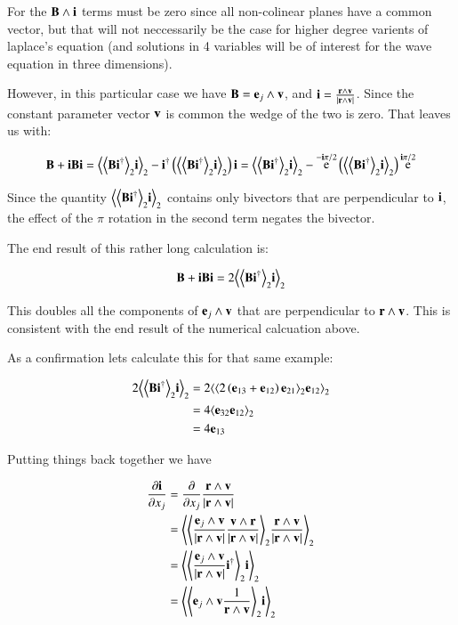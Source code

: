 \documentclass{article}      %
\newcommand{\dxj}[2] {\frac {\partial {#1}} {\partial {x_{#2}}}}
\DeclareMathOperator{\Exp}{e}
\newcommand{\gpgrade}[2] {{\left\langle{{#1}}\right\rangle}_{#2}}
\newcommand{\gpgradetwo}[1] {\gpgrade{#1}{2}}
\begin{document}
For  the $\mathbf{B} \wedge \mathbf{i}$ terms must be zero since all non-colinear planes have a common vector, but that will not neccessarily be the case for
higher degree varients of laplace's equation (and solutions in 4 variables will be of interest for the wave equation in three dimensions).

However, in this particular case we have $\mathbf{B} = \mathbf{e}_j \wedge \mathbf{v}$, and $\mathbf{i} = \frac{\mathbf{r} \wedge \mathbf{v}}{\lvert{\mathbf{r}\wedge \mathbf{v}}\rvert}$.  Since the constant parameter vector $\mathbf{v}$
is common the wedge of the two is zero.  That leaves us with:

\[
\BB + \Bi\BB\Bi
=
\gpgradetwo{\gpgradetwo{\BB \Bi^\dagger} \Bi} - \Bi^\dagger\left( \gpgradetwo{\gpgradetwo{\BB \Bi^\dagger} \Bi} \right)\Bi 
=
\gpgradetwo{\gpgradetwo{\BB \Bi^\dagger} \Bi} - \Exp^{-\Bi\pi/2}\left( \gpgradetwo{\gpgradetwo{\BB \Bi^\dagger} \Bi} \right)\Exp^{\Bi\pi/2}
\]

Since the quantity $\gpgradetwo{\gpgradetwo{\BB \Bi^\dagger} \Bi}$ contains only bivectors that are perpendicular to $\mathbf{i}$, the effect of the $\pi$ rotation in the 
second term negates the bivector.

The end result of this rather long calculation is:

\[
\BB + \Bi\BB\Bi = 2 \gpgradetwo{\gpgradetwo{\BB \Bi^\dagger} \Bi}
\]

This doubles all the components of $\mathbf{e}_j \wedge \mathbf{v}$ that are perpendicular to $\mathbf{r} \wedge \mathbf{v}$.  This is consistent with the end result of the numerical
calcuation above.

As a confirmation lets calculate this for that same example:

\begin{align*}
2\gpgradetwo{\gpgradetwo{\BB \Bi^\dagger} \Bi}
&= 2\gpgradetwo{\gpgradetwo{ 2\left(\Be_{13} + \Be_{12}\right) \Be_{21} } \Be_{12}} \\
&= 4\gpgradetwo{\Be_{32} \Be_{12}} \\
&= 4\Be_{13} \\
\end{align*}

Putting things back together we have

\begin{align*}
\dxj{\Bi}{j}
&= \dxj{}{j} \frac{\Br \wedge \Bv}{\abs{\Br \wedge \Bv}} \\
&= 
\gpgradetwo{
\gpgradetwo{ \frac{\Be_j \wedge \Bv}{\abs{\Br \wedge \Bv}} \frac{\Bv \wedge \Br}{\abs{\Br \wedge \Bv}} }
    \frac{\Br \wedge \Bv}{\abs{\Br \wedge \Bv}}
} \\
&= \gpgradetwo{ \gpgradetwo{ \frac{\Be_j \wedge \Bv}{\abs{\Br \wedge \Bv}} \Bi^\dagger } \Bi } \\
&= \gpgradetwo{ \gpgradetwo{ \Be_j \wedge \Bv \inv{\Br \wedge \Bv} } \Bi } \\
\end{align*}
\end{document}
